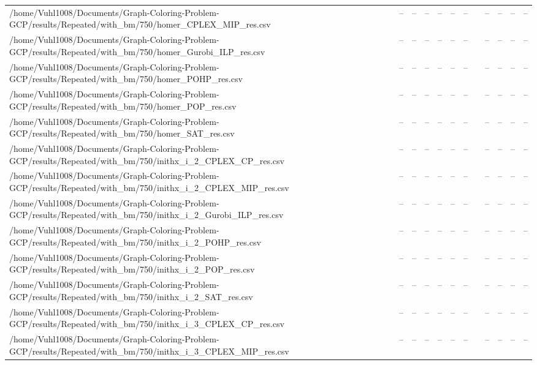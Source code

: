 \begin{table}[htbp]
\begin{tabular}{llllllllllll}
/home/Vuhl1008/Documents/Graph-Coloring-Problem-GCP/results/Repeated/with\_bm/750/homer\_CPLEX\_MIP\_res.csv & -- & -- & -- & -- & -- & -- & {} & -- & -- & -- & -- \\
/home/Vuhl1008/Documents/Graph-Coloring-Problem-GCP/results/Repeated/with\_bm/750/homer\_Gurobi\_ILP\_res.csv & -- & -- & -- & -- & -- & -- & {} & -- & -- & -- & -- \\
/home/Vuhl1008/Documents/Graph-Coloring-Problem-GCP/results/Repeated/with\_bm/750/homer\_POHP\_res.csv & -- & -- & -- & -- & -- & -- & {} & -- & -- & -- & -- \\
/home/Vuhl1008/Documents/Graph-Coloring-Problem-GCP/results/Repeated/with\_bm/750/homer\_POP\_res.csv & -- & -- & -- & -- & -- & -- & {} & -- & -- & -- & -- \\
/home/Vuhl1008/Documents/Graph-Coloring-Problem-GCP/results/Repeated/with\_bm/750/homer\_SAT\_res.csv & -- & -- & -- & -- & -- & -- & {} & -- & -- & -- & -- \\
/home/Vuhl1008/Documents/Graph-Coloring-Problem-GCP/results/Repeated/with\_bm/750/inithx\_i\_2\_CPLEX\_CP\_res.csv & -- & -- & -- & -- & -- & -- & {} & -- & -- & -- & -- \\
/home/Vuhl1008/Documents/Graph-Coloring-Problem-GCP/results/Repeated/with\_bm/750/inithx\_i\_2\_CPLEX\_MIP\_res.csv & -- & -- & -- & -- & -- & -- & {} & -- & -- & -- & -- \\
/home/Vuhl1008/Documents/Graph-Coloring-Problem-GCP/results/Repeated/with\_bm/750/inithx\_i\_2\_Gurobi\_ILP\_res.csv & -- & -- & -- & -- & -- & -- & {} & -- & -- & -- & -- \\
/home/Vuhl1008/Documents/Graph-Coloring-Problem-GCP/results/Repeated/with\_bm/750/inithx\_i\_2\_POHP\_res.csv & -- & -- & -- & -- & -- & -- & {} & -- & -- & -- & -- \\
/home/Vuhl1008/Documents/Graph-Coloring-Problem-GCP/results/Repeated/with\_bm/750/inithx\_i\_2\_POP\_res.csv & -- & -- & -- & -- & -- & -- & {} & -- & -- & -- & -- \\
/home/Vuhl1008/Documents/Graph-Coloring-Problem-GCP/results/Repeated/with\_bm/750/inithx\_i\_2\_SAT\_res.csv & -- & -- & -- & -- & -- & -- & {} & -- & -- & -- & -- \\
/home/Vuhl1008/Documents/Graph-Coloring-Problem-GCP/results/Repeated/with\_bm/750/inithx\_i\_3\_CPLEX\_CP\_res.csv & -- & -- & -- & -- & -- & -- & {} & -- & -- & -- & -- \\
/home/Vuhl1008/Documents/Graph-Coloring-Problem-GCP/results/Repeated/with\_bm/750/inithx\_i\_3\_CPLEX\_MIP\_res.csv & -- & -- & -- & -- & -- & -- & {} & -- & -- & -- & -- \\

\end{tabular}
\end{table}
